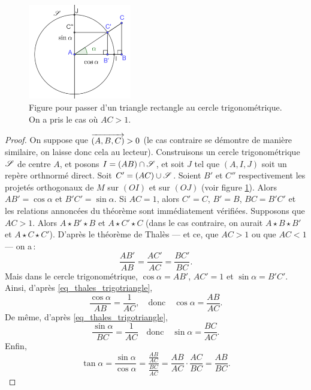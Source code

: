 		\begin{figure}
			\includegraphics[width=0.4\textwidth]{image/fct_trigo/trigo_triangle.png}
			\caption{Figure pour passer d'un triangle rectangle au cercle trigonométrique. On a pris le cas où $AC>1$.}
			\label{fig_trigo_triangle}
		\end{figure}

		\begin{proof}
			On suppose que $\ovr{(A,B,C)}>0$ (le cas contraire se démontre de manière similaire, on laisse donc cela au lecteur). Construisons un cercle trigonométrique $\S$ de centre $A$, et posons $I=(AB)\cap\S$, et soit $J$ tel que $(A,I,J)$ soit un repère orthnormé direct. Soit $C'=(AC)\cup\S$. Soient $B'$ et $C''$ respectivement les projetés orthogonaux de $M$ sur $(OI)$ et sur $(OJ)$ (voir figure \ref{fig_trigo_triangle}). Alors $AB'=\cos\alpha$ et $B'C'=\sin\alpha$. Si $AC=1$, alors $C'=C$, $B'=B$, $BC=B'C'$ et les relations annoncées du théorème sont immédiatement vérifiées. Supposons que $AC>1$. Alors $A\star B'\star B$ et $A\star C'\star C$ (dans le cas contraire, on aurait $A\star B\star B'$ et $A\star C\star C'$). D'après le théorème de Thalès --- et ce, que $AC>1$ ou que $AC<1$ --- on a\,:
			\begin{equation}
				\frac{AB'}{AB}=\frac{AC'}{AC}=\frac{BC'}{BC}. \label{eq_thales_trigotriangle}
			\end{equation} 
			Mais dans le cercle trigonométrique, $\cos\alpha=AB'$, $AC'=1$ et $\sin\alpha=B'C'$. Ainsi, d'après \eqref{eq_thales_trigotriangle},
			\begin{equation}
				\frac{\cos\alpha}{AB}=\frac{1}{AC},\quad \text{donc}\quad \cos\alpha=\frac{AB}{AC}.
			\end{equation}
			De même, d'après \eqref{eq_thales_trigotriangle},
			\begin{equation}
				\frac{\sin\alpha}{BC}=\frac{1}{AC}\quad \text{donc}\quad \sin\alpha=\frac{BC}{AC}.
			\end{equation}
			Enfin,
			\begin{equation}
				\tan\alpha=\frac{\sin\alpha}{\cos\alpha}=\frac{\frac{AB}{AC}}{\frac{BC}{AC}}=\frac{AB}{AC}\cdot\frac{AC}{BC}=\frac{AB}{BC}.
			\end{equation}
		\end{proof}

